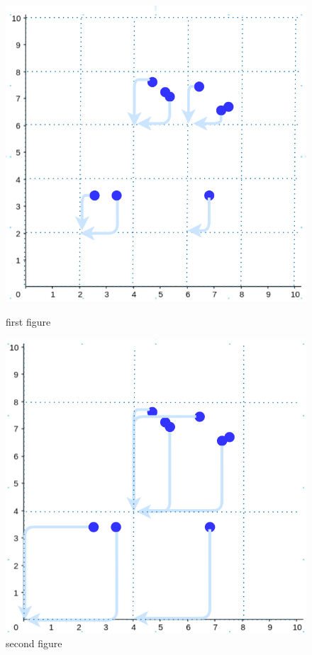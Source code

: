 \begin{figure}
  \centering
  \begin{minipage}{0.45\linewidth}
      \centering
      \includegraphics[width=\textwidth]{images/binning-1dev.png}
      \caption{first figure}
  \end{minipage}\hfill
  \begin{minipage}{0.45\linewidth}
      \centering
      \includegraphics[width=\textwidth]{images/binning-2dev.png}
      \caption{second figure}
  \end{minipage}
\end{figure}

